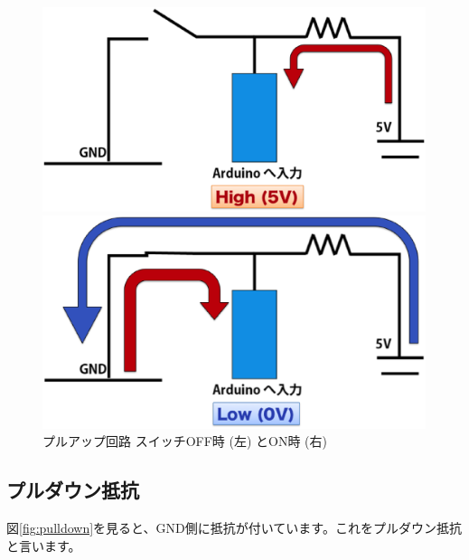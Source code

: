\documentclass[11pt,a4paper]{jarticle}
\begin{document}
\begin{figure}[htbp]
 \begin{minipage}{0.5\columnwidth}
  \centering
  \includegraphics[width=0.9\columnwidth]{img/pullup_off.eps}
 \end{minipage}
 \begin{minipage}{0.5\columnwidth}
  \includegraphics[width=0.9\columnwidth]{img/pullup_on.eps}
 \end{minipage}
 \caption{プルアップ回路 スイッチOFF時 (左) とON時 (右)  }
 \label{fig:pullup}
\end{figure}


 
\subsection{プルダウン抵抗}
 図\ref{fig:pulldown}を見ると、GND側に抵抗が付いています。これをプルダウン抵抗と言います。
 
\end{document}
